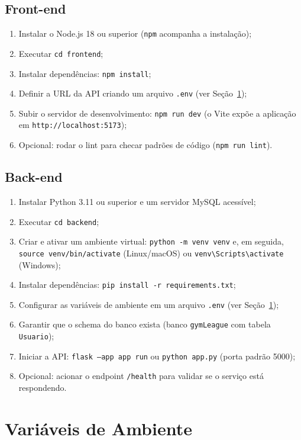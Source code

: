 \subsection{Front-end}
\begin{enumerate}
    \item Instalar o Node.js 18 ou superior (\texttt{npm} acompanha a instalação);
    \item Executar \texttt{cd frontend};
    \item Instalar dependências: \texttt{npm install};
    \item Definir a URL da API criando um arquivo \texttt{.env} (ver Seção~\ref{sec:variables});
    \item Subir o servidor de desenvolvimento: \texttt{npm run dev} (o Vite expõe a aplicação em \texttt{http://localhost:5173});
    \item Opcional: rodar o lint para checar padrões de código (\texttt{npm run lint}).
\end{enumerate}

\subsection{Back-end}
\begin{enumerate}
    \item Instalar Python 3.11 ou superior e um servidor MySQL acessível;
    \item Executar \texttt{cd backend};
    \item Criar e ativar um ambiente virtual: \texttt{python -m venv venv} e, em seguida, \texttt{source venv/bin/activate} (Linux/macOS) ou \texttt{venv\textbackslash Scripts\textbackslash activate} (Windows);
    \item Instalar dependências: \texttt{pip install -r requirements.txt};
    \item Configurar as variáveis de ambiente em um arquivo \texttt{.env} (ver Seção~\ref{sec:variables});
    \item Garantir que o schema do banco exista (banco \texttt{gymLeague} com tabela \texttt{Usuario});
    \item Iniciar a API: \texttt{flask --app app run} ou \texttt{python app.py} (porta padrão 5000);
    \item Opcional: acionar o endpoint \texttt{/health} para validar se o serviço está respondendo.
\end{enumerate}

\section{Variáveis de Ambiente}
\label{sec:variables}

